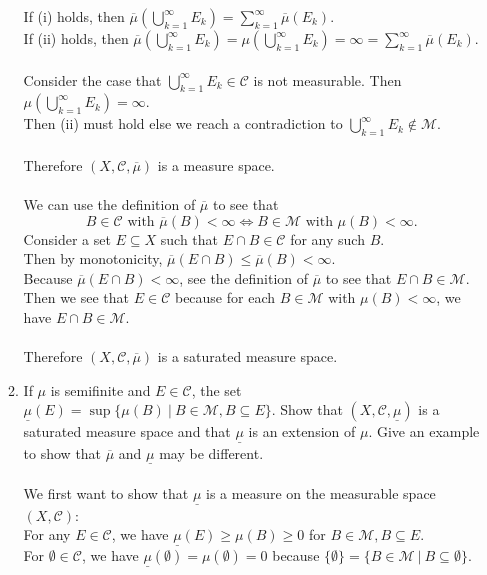 \begin{enumerate}
\begin{enumerate}[label=(\roman*),align=left]
		If (i) holds, then $\overline\mu(\bigcup_{k=1}^\infty E_k)=\sum_{k=1}^\infty\overline\mu(E_k)$.\\
		If (ii) holds, then $\overline\mu(\bigcup_{k=1}^\infty E_k)=\mu(\bigcup_{k=1}^\infty E_k)=\infty=\sum_{k=1}^\infty \overline\mu(E_k)$.\\
		\\Consider the case that $\bigcup_{k=1}^\infty E_k\in\mathcal{C}$ is not measurable. Then $\mu(\bigcup_{k=1}^\infty E_k)=\infty$. \\
		Then (ii) must hold else we reach a contradiction to $\bigcup_{k=1}^\infty E_k\notin\mathcal{M}$.\\
		\\Therefore $(X,\mathcal{C},\overline\mu)$ is a measure space.\\
		\\We can use the definition of $\overline\mu$ to see that 
		\[
			B\in\mathcal{C}\text{ with }\overline\mu(B)<\infty\iff B\in\mathcal{M}\text{ with }\mu(B)<\infty.
		\]
		Consider a set $E\subseteq X$ such that $E\cap B\in\mathcal{C}$ for any such $B$.
		\\Then by monotonicity, $\overline\mu(E\cap B)\le \overline\mu(B)<\infty$.
		\\Because $\overline\mu(E\cap B)<\infty$, see the definition of $\overline\mu$ to see that $E\cap B\in\mathcal{M}$.
		\\Then we see that $E\in\mathcal{C}$ because for each $B\in\mathcal{M}$ with $\mu(B)<\infty$, we have $E\cap B\in\mathcal{M}$.\\
		\\Therefore $(X,\mathcal{C},\overline\mu)$ is a saturated measure space.
		\item If $\mu$ is semifinite and $E\in\mathcal{C}$, the set $\underline\mu(E)=\sup\{\mu(B)\ |\ B\in\mathcal{M},B\subseteq E\}$.
		Show that $(X,\mathcal{C},\underline\mu)$ is a saturated measure space and that $\underline\mu$ is an extension of $\mu$.
		Give an example to show that $\overline\mu$ and $\underline\mu$ may be different.\\
		\\We first want to show that $\underline\mu$ is a measure on the measurable space $(X,\mathcal{C})$:
		\\For any $E\in\mathcal{C}$, we have $\underline\mu(E)\ge\mu(B)\ge0$ for $B\in\mathcal{M},B\subseteq E$.
		\\For $\emptyset\in\mathcal{C}$, we have $\underline\mu(\emptyset)=\mu(\emptyset)=0$ because $\{\emptyset\}=\{B\in\mathcal{M}\ |\ B\subseteq\emptyset\}$.

\end{enumerate}
\end{enumerate}
